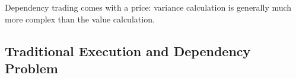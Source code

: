 \documentclass[twoside]{article}
\numberwithin{equation}{section}
\newcommand{\eqspace}{\;\;\;}
\begin{document}
Dependency trading comes with a price: variance calculation is generally much more complex than the value calculation.


\subsection{Traditional Execution and Dependency Problem}

\end{document}
